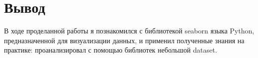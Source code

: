 \chapter{Вывод}
\label{ch:chap3}

В ходе проделанной работы я познакомился с библиотекой seaborn языка Python, предназначенной для визуализации данных, и применил
полученные знания на практике: проанализировал с помощью библиотек небольшой dataset.





\endinput